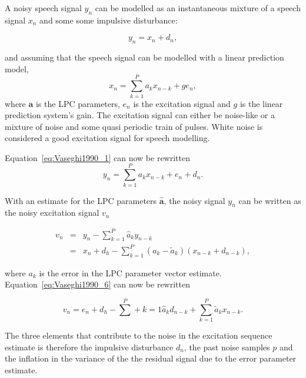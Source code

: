 A noisy speech signal $y_n$ can be modelled as an instantaneous mixture of a speech signal $x_n$ and some some impulsive disturbance:

\begin{equation}\label{eq:Vaseghi1990_1}
y_n = x_n + d_n,
\end{equation}

and assuming that the speech signal can be modelled with a linear prediction model,
\begin{equation}\label{eq:Vaseghi1990_4}
x_n = \sum^P_{k=1} a_k x_{n-k} +ge_n,
\end{equation}
where $\mathbf{a}$ is the LPC parameters, $e_n$ is the excitation signal and $g$ is the linear prediction system's gain. The excitation signal can either be noise-like or a mixture of noise and some quasi periodic train of pulses. White noise is considered a good excitation signal for speech modelling\cite{Vaseghi1990}.

Equation~\ref{eq:Vaseghi1990_1} can now be rewritten
\begin{equation}\label{eq:Vaseghi1990_5}
y_n = \sum^P_{k=1} a_k x_{n-k} + e_n + d_n.
\end{equation}

With an estimate for the LPC parameters $\mathbf{\hat{a}}$, the noisy signal $y_n$ can be written as the noisy excitation signal $v_n$

\begin{eqnarray}
  v_n &=& y_n - \sum^P_{k=1} \hat{a}_k y_{n-k} \nonumber\\
  &=& x_n + d_h - \sum^P_{k=1} (a_k - \tilde{a}_k)(x_{n-k} + d_{n-k}),\label{eq:Vaseghi1990_6}
\end{eqnarray}

where $a_k$ is the error in the LPC parameter vector estimate. Equation~\ref{eq:Vaseghi1990_6} can now be rewritten

\begin{equation}\label{eq:Vaseghi1990_7}
v_n = e_n + d_h - \sum^P+{k=1} \hat{a}_k d_{n-k} + \sum^P_{k=1} \tilde{a}_k x_{n-k}.
\end{equation}

The three elements that contribute to the noise in the excitation sequence estimate is therefore the impulsive disturbance $d_n$, the past noise samples $p$ and the inflation in the variance of the the residual signal due to the error parameter estimate\cite{Vaseghi1990}.


